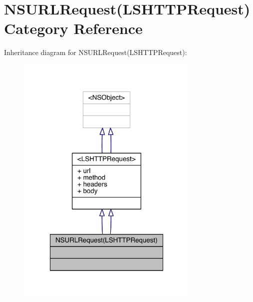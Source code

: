 \hypertarget{category_n_s_u_r_l_request_07_l_s_h_t_t_p_request_08}{\section{N\-S\-U\-R\-L\-Request(L\-S\-H\-T\-T\-P\-Request) Category Reference}
\label{category_n_s_u_r_l_request_07_l_s_h_t_t_p_request_08}
}


Inheritance diagram for N\-S\-U\-R\-L\-Request(L\-S\-H\-T\-T\-P\-Request)\-:\nopagebreak
\begin{figure}[H]
\begin{center}
\leavevmode
\includegraphics[width=248pt]{category_n_s_u_r_l_request_07_l_s_h_t_t_p_request_08__inherit__graph}
\end{center}
\end{figure}


